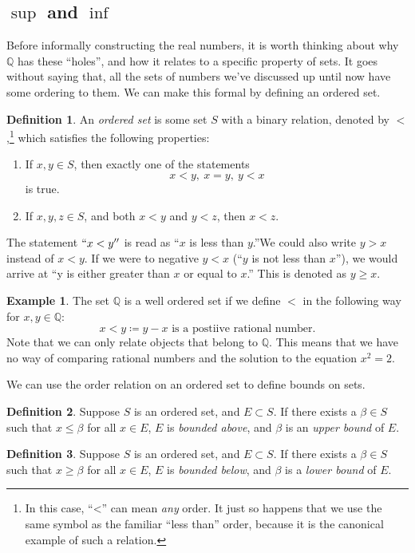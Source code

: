 \documentclass{article}
\newcommand{\Q}{\mathbb{Q}}
\theoremstyle{definition}
\newtheorem{definition}{Definition}[section]
\newtheorem{example}{Example}[section]
\begin{document}
\subsection{$ \sup $ and $ \inf $}
Before informally constructing the real numbers, it is worth thinking about why $ \Q $ has these ``holes'', and how it relates to a specific property of sets. It goes without saying that, all the sets of numbers we've discussed up until now have some ordering to them. We can make this formal by defining an ordered set.
\begin{definition}
	An \textit{\color{red}ordered set} is some set $ S $ with a binary relation, denoted by $ < $,\footnote{In this case, ``<'' can mean \textit{any} order. It just so happens that we use the same symbol as the familiar ``less than'' order, because it is the canonical example of such a relation.} which satisfies the following properties:
	\begin{enumerate}
		\item If $ x,y\in S $, then exactly one of the statements $$x<y,\ x=y,\ y<x $$ is true.
		\item If $ x,y,z\in S $, and both $ x<y $ and $ y<z $, then $ x<z $. 
	\end{enumerate}
\end{definition}  
The statement $ ``x<y'' $ is read as ``$ x  $ is less than $ y $.''We could also write $ y>x $ instead of $ x<y $. If we were to negative $ y<x $ (``$ y $ is not less than $ x $''), we would arrive at ``y is either greater than $ x $ or equal to $ x $.'' This is denoted as $ y\ge x $. 
\begin{example}
	The set $ \Q $ is a well ordered set if we define $ < $ in the following way for $ x,y\in\Q $:
	$$ x<y\coloneqq y-x \text{ is a postiive rational number}.   $$ Note that we can only relate objects that belong to $ \Q $. This means that we have no way of comparing rational numbers and the solution to the equation $ x^2=2 $.  
\end{example}
We can use the order relation on an ordered set to define bounds on sets.
\begin{definition}
	Suppose $ S $ is an ordered set, and $ E\subset S $. If there exists a $ \beta\in S $ such that $ x\le\beta $ for all $ x\in E $, $ E $ is \textit{\color{red}bounded above}, and $ \beta $ is an \textit{\color{red} upper bound} of $ E $. 
\end{definition}
\begin{definition}
	Suppose $ S $ is an ordered set, and $ E\subset S $. If there exists a $ \beta\in S $ such that $ x\ge\beta $ for all $ x\in E $, $ E $ is \textit{\color{red}bounded below}, and $ \beta $ is a \textit{\color{red} lower bound} of $ E $. 
\end{definition}
\end{document}
